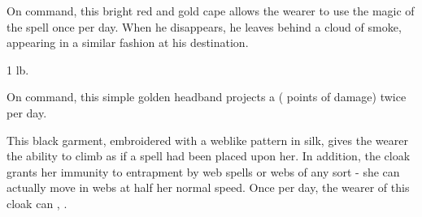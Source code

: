 \begin{comment}
Bracers of Armor: These items appear to be wrist or arm guards. They surround the wearer with an invisible but tangible field of force, granting him an armor bonus of \plus1 to \plus8, just as though he were wearing armor. Both bracers must be worn for the magic to be effective.

Moderate conjuration; CL 7th; Craft Wondrous Item, mage armor, creator's caster level must be at least two times that of the bonus placed in the bracers; Price 1,000 gp (\plus1), 4,000 gp (\plus2), 9,000 gp (\plus3), 16,000 gp (\plus4), 25,000 gp (\plus5), 36,000 gp (\plus6), 49,000 gp (\plus7), 64,000 gp (\plus8);Weight 1 lb.
\end{comment}

 On command, this bright red and gold cape allows the wearer to use the magic of the  spell once per day. When he disappears, he leaves behind a cloud of smoke, appearing in a similar fashion at his destination.

 1 lb.

 On command, this simple golden headband projects a  ( points of  damage) twice per day.

\begin{comment}
\itemdescription{Circlet of Blasting, Major}{25,000}{14th}{Head}{12th}{Strong evocation} On command, this elaborate golden headband projects a \my{\spell{scorching ray}} (\my{10d6 \mtimes 1.5} points of \my{fire} damage) once per day.
\prereq{Craft Wondrous Item, \my{Empower} Spell, \my{scorching ray}}
\end{comment}

 This black garment, embroidered with a weblike pattern in silk, gives the wearer the ability to climb as if a  spell had been placed upon her. In addition, the cloak grants her immunity to entrapment by web spells or webs of any sort - she can actually move in webs at half her normal speed. Once per day, the wearer of this cloak can  , .

